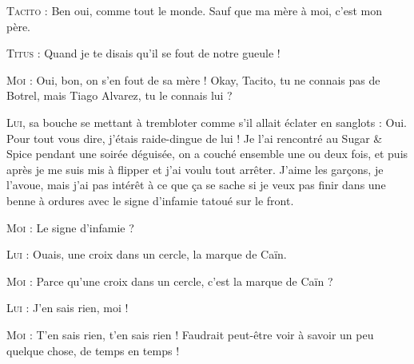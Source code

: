 \begin{dialogue}
\textsc{Tacito} : Ben oui, comme tout le monde. Sauf que ma mère à moi, c’est mon père.

\textsc{Titus} : Quand je te disais qu’il se fout de notre gueule !

\textsc{Moi} : Oui, bon, on s’en fout de sa mère ! Okay, Tacito, tu ne connais pas de Botrel, mais Tiago Alvarez, tu le connais lui ?

\textsc{Lui}, sa bouche se mettant à trembloter comme s’il allait éclater en sanglots : Oui. Pour tout vous dire, j’étais raide-dingue de lui ! Je l’ai rencontré au Sugar \& Spice pendant une soirée déguisée, on a couché ensemble une ou deux fois, et puis après je me suis mis à flipper et j’ai voulu tout arrêter. J’aime les garçons, je l’avoue, mais j’ai pas intérêt à ce que ça se sache si je veux pas finir dans une benne à ordures avec le signe d’infamie tatoué sur le front.

\textsc{Moi} : Le signe d’infamie ?

\textsc{Lui} : Ouais, une croix dans un cercle, la marque de Caïn.

\textsc{Moi} : Parce qu’une croix dans un cercle, c’est la marque de Caïn ?

\textsc{Lui} : J’en sais rien, moi !

\textsc{Moi} : T’en sais rien, t’en sais rien ! Faudrait peut-être voir à savoir un peu quelque chose, de temps en temps !


\end{dialogue}
